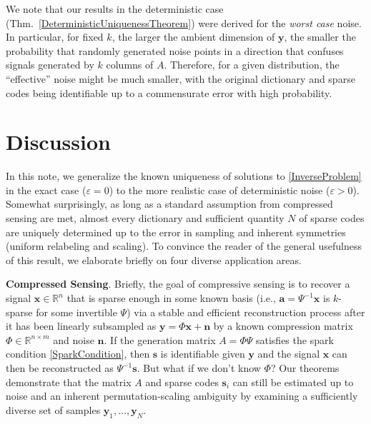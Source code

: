 \documentclass[journal, twocolumn]{IEEEtran}
\begin{document}
We note that our results in the deterministic case (Thm.~\ref{DeterministicUniquenessTheorem}) were derived for the \emph{worst case} noise.  In particular, for fixed $k$, the larger the ambient dimension of $\mathbf{y}$, the smaller the probability that randomly generated noise points in a direction that confuses signals generated by $k$ columns of $A$.  Therefore, for a given distribution, the ``effective'' noise might be much smaller, with the original dictionary and sparse codes being identifiable up to a commensurate error with high probability. 


\section{Discussion}

In this note, we generalize the known uniqueness of solutions to \eqref{InverseProblem} in the exact case ($\varepsilon = 0$) to the more realistic case of deterministic noise ($\varepsilon > 0$).  Somewhat surprisingly, as long as a standard assumption from compressed sensing are met, almost every dictionary and sufficient quantity $N$ of sparse codes are uniquely determined up to the error in sampling and inherent symmetries (uniform relabeling and scaling). To convince the reader of the general usefulness of this result, we elaborate briefly on four diverse application areas.

\textbf{Compressed Sensing}.
Briefly, the goal of compressive sensing is to recover a signal $\mathbf{x} \in \mathbb{R}^n$ that is sparse enough in some known basis (i.e., $\mathbf{a} = \Psi^{-1} \mathbf{x}$ is $k$-sparse for some invertible $\Psi$) via a stable and efficient reconstruction process after it has been linearly subsampled as $\mathbf{y} = \Phi \mathbf{x} + \mathbf{n}$ by a known compression matrix $\Phi \in \mathbb{R}^{n \times m}$ and noise $\mathbf{n}$. If the generation matrix $A = \Phi\Psi$ satisfies the spark condition \eqref{SparkCondition}, then $\mathbf{s}$ is identifiable given $\mathbf{y}$ and the signal $\mathbf{x}$ can then be reconstructed as $\Psi^{-1}\mathbf{s}$. But what if we don't know $\Phi$? Our theorems demonstrate that the matrix $A$ and sparse codes $\mathbf{s}_i$ can still be estimated up to noise and an inherent permutation-scaling ambiguity by examining a sufficiently diverse set of samples $\mathbf{y}_1, \ldots, \mathbf{y}_N$. 
\end{document}
